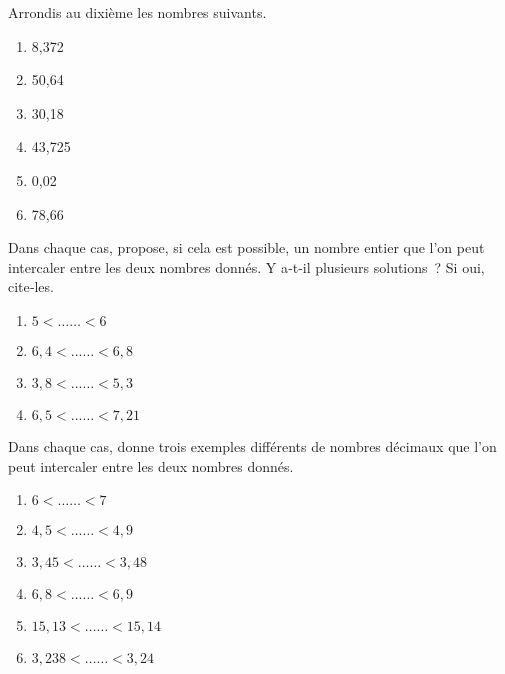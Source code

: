 \begin{exercice}
Arrondis au dixième les nombres suivants. %
\begin{enumerate}
 \item 8,372 \dotfill \hspace*{13em}
 
 \item 50,64 \dotfill \hspace*{13em}
 
 \item 30,18 \dotfill \hspace*{13em}
 
 \item 43,725 \dotfill \hspace*{13em}
 
 \item 0,02 \dotfill \hspace*{13em}
 
 \item 78,66 \dotfill \hspace*{13em}
 
 \end{enumerate}
\end{exercice}


\begin{exercice}
Dans chaque cas, propose, si cela est possible, un nombre entier que l'on peut intercaler entre les deux nombres donnés. 
Y a‑t‑il plusieurs solutions ? Si oui, cite‑les.
\begin{enumerate}
 \item $5 < …… < 6$
 \item $6,4 < …… < 6,8$
 \item $3,8 < …… < 5,3$
 \item $6,5 < …… < 7,21$ %
 \end{enumerate}
\end{exercice}


\begin{exercice}
Dans chaque cas, donne trois exemples différents de nombres décimaux que l'on peut intercaler entre les deux nombres donnés.
\begin{enumerate}
 \item $6 < …… < 7$
 \item $4,5 < …… < 4,9$
 \item $3,45 < …… < 3,48$
 \item $6,8 < …… < 6,9$
 \item $15,13 < …… < 15,14$
 \item $3,238 < …… < 3,24$ %
 \end{enumerate}
\end{exercice}


